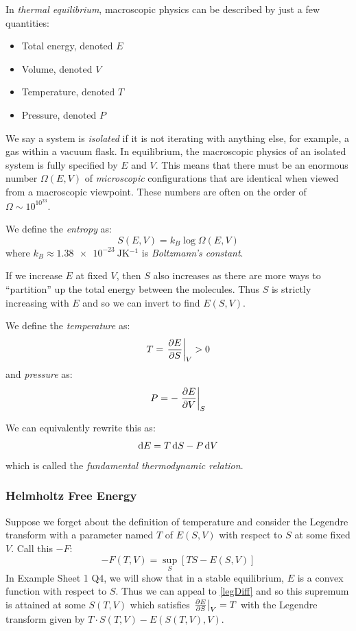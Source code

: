 \documentclass[../main.tex]{subfiles}
\begin{document}
In \textit{thermal equilibrium}, macroscopic physics can be described by just a few quantities:
\begin{itemize}
  \item Total energy, denoted $E$
  \item Volume, denoted $V$
  \item Temperature, denoted $T$
  \item Pressure, denoted $P$
\end{itemize}

We say a system is \textit{isolated} if it is not iterating with anything else, for example, a gas within a vacuum flask.
In equilibrium, the macroscopic physics of an isolated system is fully specified by $E$ and $V$.
This means that there must be an enormous number $\Omega(E, V)$ of \textit{microscopic} configurations that are identical when viewed from a macroscopic viewpoint.
These numbers are often on the order of $\Omega \sim 10^{10^{23}}$.

\begin{definition}[Entropy]
  We define the \textit{entropy} as:
  \[
    S(E, V) = k_{B} \log \Omega(E, V)
  \]
  where $k_B \approx \qty{1.38e-23}{\joule\kelvin^{-1}}$ is \textit{Boltzmann's constant}.
\end{definition}
If we increase $E$ at fixed $V$, then $S$ also increases as there are more ways to ``partition'' up the total energy between the molecules.
Thus $S$ is strictly increasing with $E$ and so we can invert to find $E(S, V)$.
\begin{definition}
  We define the \textit{temperature} as: \label{tempPressure}
  \[
    T = \at{\pderiv{E}{S}}{V} > 0
  \]
  and \textit{pressure} as:
  \[
    P = -\at{\pderiv{E}{V}}{S}
  \]
\end{definition}
\begin{remark}
  We can equivalently rewrite this as:
  \begin{equation}
    \d{E} = T \d{S} - P \d{V} \label{thermoRelation}
  \end{equation}
  which is called the \textit{fundamental thermodynamic relation}.
\end{remark}
\subsubsection{Helmholtz Free Energy}
Suppose we forget about the definition of temperature and consider the Legendre transform with a parameter named $T$ of $E(S, V)$ with respect to $S$ at some fixed $V$.
Call this $-F$:
\[
  -F(T, V) = \sup_{S} [TS - E(S, V)]
\]
In Example Sheet 1 Q4, we will show that in a stable equilibrium, $E$ is a convex function with respect to $S$.
Thus we can appeal to \cref{legDiff} and so this supremum is attained at some $S(T, V)$ which satisfies $\at{\pderiv{E}{S}}{V} = T$ with the Legendre transform given by $T \cdot S(T, V) - E(S(T, V), V)$.
\end{document}
